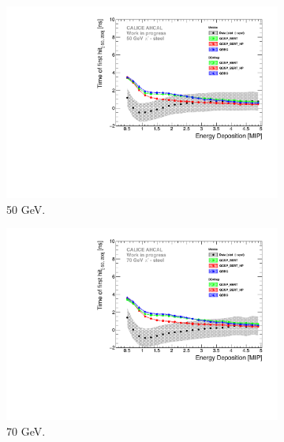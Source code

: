 \begin{figure}[htbp!]
\begin{subfigure}[t]{0.5\textwidth}
		\includegraphics[width=1\textwidth]{chap5/fig_AHCAL_timing/Pions/ComparisonToSim/Time_Energy_50GeV.pdf}
		\caption{50 GeV.} \label{fig:Energy_SimData_50GeV}
	\end{subfigure}
	\hfill
	\begin{subfigure}[t]{0.5\textwidth}
		\centering
		\includegraphics[width=1\textwidth]{chap5/fig_AHCAL_timing/Pions/ComparisonToSim/Time_Energy_70GeV.pdf}
		\caption{70 GeV.} \label{fig:Energy_SimData_70GeV}
	\end{subfigure}
	\hfill
	\begin{subfigure}[t]{0.5\textwidth}
		\centering

\end{subfigure}
\end{figure}
